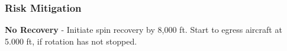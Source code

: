 % 
% 
%
 \subsubsection*{Risk Mitigation}
 \begin{compactenum}
   \item \textbf{No Recovery} - Initiate spin recovery by 8,000 ft.  Start to egress aircraft at 5.000 ft, if rotation has not stopped.
   \end{compactenum}